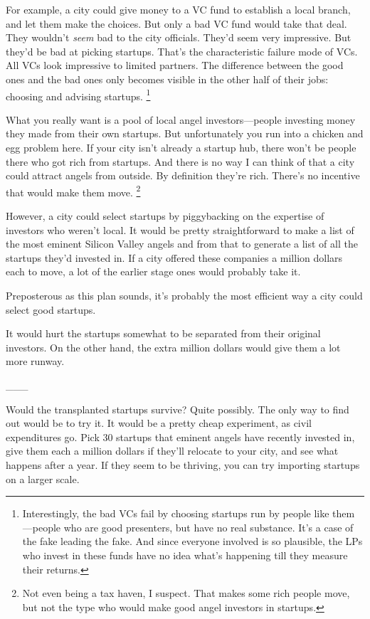 For example, a city could give money to a VC fund to establish a local
branch, and let them make the choices. But only a bad VC fund would take
that deal. They wouldn't \emph{seem} bad to the city officials. They'd
seem very impressive. But they'd be bad at picking startups. That's the
characteristic failure mode of VCs. All VCs look impressive to limited
partners. The difference between the good ones and the bad ones only
becomes visible in the other half of their jobs: choosing and advising
startups. \footnote{Interestingly, the bad VCs fail by choosing startups run by
people like them---people who are good presenters, but have no real
substance. It's a case of the fake leading the fake. And since everyone
involved is so plausible, the LPs who invest in these funds have no idea
what's happening till they measure their returns.}

What you really want is a pool of local angel investors---people
investing money they made from their own startups. But unfortunately you
run into a chicken and egg problem here. If your city isn't already a
startup hub, there won't be people there who got rich from startups. And
there is no way I can think of that a city could attract angels from
outside. By definition they're rich. There's no incentive that would
make them move. \footnote{Not even being a tax haven, I suspect. That makes some rich
people move, but not the type who would make good angel investors in
startups.}

However, a city could select startups by piggybacking on the expertise
of investors who weren't local. It would be pretty straightforward to
make a list of the most eminent Silicon Valley angels and from that to
generate a list of all the startups they'd invested in. If a city
offered these companies a million dollars each to move, a lot of the
earlier stage ones would probably take it.

Preposterous as this plan sounds, it's probably the most efficient way a
city could select good startups.

It would hurt the startups somewhat to be separated from their original
investors. On the other hand, the extra million dollars would give them
a lot more runway.

\_\_\_

Would the transplanted startups survive? Quite possibly. The only way to
find out would be to try it. It would be a pretty cheap experiment, as
civil expenditures go. Pick 30 startups that eminent angels have
recently invested in, give them each a million dollars if they'll
relocate to your city, and see what happens after a year. If they seem
to be thriving, you can try importing startups on a larger scale.


